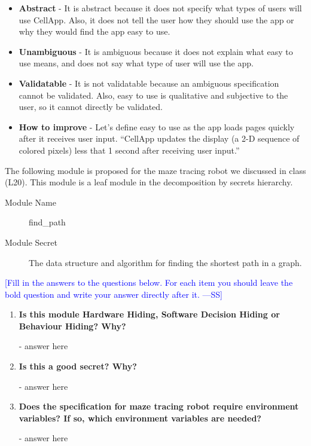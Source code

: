 \documentclass[12pt,fleqn]{examtst}
\newcommand{\authornote}[3]{\textcolor{#1}{[#3 ---#2]}}
\newcommand{\authornote}[3]{}
\newcommand{\wss}[1]{\authornote{blue}{SS}{#1}}
\begin{document}
\begin{itemize}
\item \textbf{Abstract} - It is abstract because it does not specify what types of users will use CellApp. Also, it does not tell the user how they should use the app or why they would find the app easy to use.
\item \textbf{Unambiguous} - It is ambiguous because it does not explain what easy to use means, and does not say what type of user will use the app.
\item \textbf{Validatable} - It is not validatable because an ambiguous specification cannot be validated. Also, easy to use is qualitative and subjective to the user, so it cannot directly be validated.
\item \textbf{How to improve} - Let's define easy to use as the app loads pages quickly after it receives user input. ``CellApp updates the display (a 2-D sequence of colored pixels) less that 1 second after receiving user input.''
\end{itemize}


\newpage

 The following module is proposed for the maze tracing robot
we discussed in class (L20).  This module is a leaf module in the decomposition
by secrets hierarchy.

\begin{description}
\item [Module Name] find\_path
\item [Module Secret] The data structure and algorithm for finding the shortest
  path in a graph.
\end{description}

\noindent \wss{Fill in the answers to the questions below.  For each item you
  should leave the bold question and write your answer directly after it.}

\begin{enumerate}
\item \textbf{Is this module Hardware Hiding, Software Decision Hiding or
    Behaviour Hiding?  Why?}

  - answer here

\item \textbf{Is this a good secret?  Why?}

  - answer here

\item \textbf{Does the specification for maze tracing robot require environment
    variables?  If so, which environment variables are needed?}

  - answer here

\end{enumerate}
\end{document}
